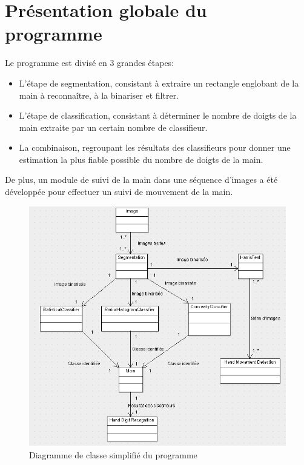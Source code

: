 \section{Présentation globale du programme}
Le programme est divisé en 3 grandes étapes:
\begin{itemize}
\item L'étape de segmentation, consistant à extraire un rectangle englobant de la main à reconnaître, à la binariser et filtrer.
\item L'étape de classification, consistant à déterminer le nombre de doigts de la main extraite par un certain nombre de classifieur.
\item La combinaison, regroupant les résultats des classifieurs pour donner une estimation la plus fiable possible du nombre de doigts de la main.
\end{itemize}

De plus, un module de suivi de la main dans une séquence d'images a été développée pour effectuer un suivi de mouvement de la main.

\begin{figure}[htb!]
\centerline{\includegraphics[scale=0.6]{Diagramme_classes.png}}
\caption{Diagramme de classe simplifié du programme}
\label{fig:diagrammeClasses}
\end{figure}